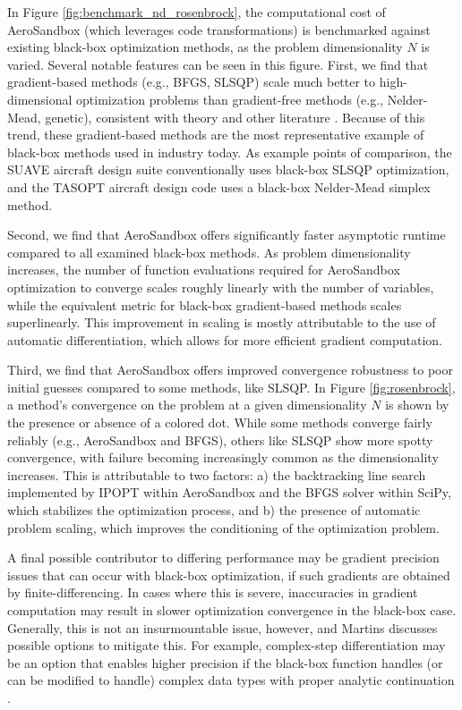 In Figure \ref{fig:benchmark_nd_rosenbrock}, the computational cost of AeroSandbox (which leverages code transformations) is benchmarked against existing black-box optimization methods, as the problem dimensionality $N$ is varied. Several notable features can be seen in this figure. First, we find that gradient-based methods (e.g., BFGS, SLSQP) scale much better to high-dimensional optimization problems than gradient-free methods (e.g., Nelder-Mead, genetic), consistent with theory and other literature \cite{martins_engineering_2021, kochenderfer_algorithms_2019}. Because of this trend, these gradient-based methods are the most representative example of black-box methods used in industry today. As example points of comparison, the SUAVE aircraft design suite \cite{SUAVE2017} conventionally uses black-box SLSQP optimization, and the TASOPT aircraft design code \cite{drela_tasopt_2010} uses a black-box Nelder-Mead simplex method.

Second, we find that AeroSandbox offers significantly faster asymptotic runtime compared to all examined black-box methods. As problem dimensionality increases, the number of function evaluations required for AeroSandbox optimization to converge scales roughly linearly with the number of variables, while the equivalent metric for black-box gradient-based methods scales superlinearly. This improvement in scaling is mostly attributable to the use of automatic differentiation, which allows for more efficient gradient computation.

Third, we find that AeroSandbox offers improved convergence robustness to poor initial guesses compared to some methods, like SLSQP. In Figure \ref{fig:rosenbrock}, a method's convergence on the problem at a given dimensionality $N$ is shown by the presence or absence of a colored dot. While some methods converge fairly reliably (e.g., AeroSandbox and BFGS), others like SLSQP show more spotty convergence, with failure becoming increasingly common as the dimensionality increases. This is attributable to two factors: a) the backtracking line search implemented by IPOPT within AeroSandbox and the BFGS solver within SciPy, which stabilizes the optimization process, and b) the presence of automatic problem scaling, which improves the conditioning of the optimization problem.

A final possible contributor to differing performance may be gradient precision issues that can occur with black-box optimization, if such gradients are obtained by finite-differencing. In cases where this is severe, inaccuracies in gradient computation may result in slower optimization convergence in the black-box case. Generally, this is not an insurmountable issue, however, and Martins \cite{martins_engineering_2021} discusses possible options to mitigate this. For example, complex-step differentiation may be an option that enables higher precision if the black-box function handles (or can be modified to handle) complex data types with proper analytic continuation \cite{lai_extensions_2008, martins_complexstep_2003}.

